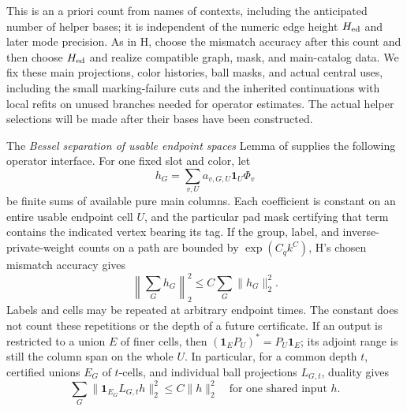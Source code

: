 This is an a priori count from names of contexts, including the
anticipated number of helper bases; it is independent of the
numeric edge height \(H_{\rm ed}\) and later mode precision.  As
in H, choose the mismatch accuracy after this count and then choose
\(H_{\rm ed}\) and realize compatible graph, mask, and main-catalog
data.  We fix these main projections, color histories, ball masks,
and actual central uses, including the small marking-failure cuts
and the inherited continuations with local refits on unused branches
needed for operator estimates.  The actual helper selections will
be made after their bases have been constructed.

The \emph{Bessel separation of usable endpoint spaces} Lemma of
\cite[Section~6]{H} supplies the following operator interface.  For
one fixed slot and color, let
\[
 h_G=\sum_{v,U}a_{v,G,U}\mathbf1_U\Phi_v
\]
be finite sums of available pure main columns.  Each coefficient is
constant on an entire usable endpoint cell \(U\), and the particular
pad mask certifying that term contains the indicated vertex bearing its tag.
If the group, label, and inverse-private-weight counts on a path are
bounded by \(\exp(C_qk^C)\), H's chosen mismatch accuracy gives
\begin{equation}
 \left\|\sum_Gh_G\right\|_2^2\le C\sum_G\|h_G\|_2^2.
 \label{eq:h-usable-synthesis}
\end{equation}
Labels and cells may be repeated at arbitrary endpoint times.  The
constant does not count these repetitions or the depth of a future
certificate.  If an output is restricted to a union \(E\) of finer
cells, then \((\mathbf1_E P_U)^*=P_U\mathbf1_E\); its adjoint range
is still the column span on the whole \(U\).  In particular, for a
common depth \(t\), certified unions \(E_G\) of \(t\)-cells, and
individual ball projections \(L_{G,t}\), duality gives
\begin{equation}
 \sum_G\|\mathbf1_{E_G}L_{G,t}h\|_2^2\le C\|h\|_2^2
 \quad\text{for one shared input }h.
 \label{eq:h-usable-rows}
\end{equation}

